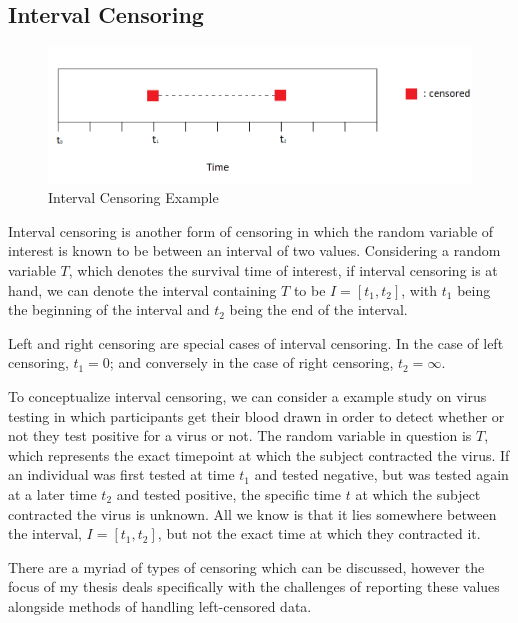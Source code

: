 \documentclass[12pt, twoside]{amherstthesis}
\begin{document}
\hypertarget{interval}{%
\subsection{Interval Censoring}\label{interval}}
\begin{figure}

{\centering \includegraphics[width=1\linewidth]{figures/interval_censoring_example_fix} 

}

\caption{Interval Censoring Example}\label{fig:intervalcensoringexample}
\end{figure}
Interval censoring is another form of censoring in which the random variable of interest is known to be between an interval of two values. Considering a random variable \(T\), which denotes the survival time of interest, if interval censoring is at hand, we can denote the interval containing \(T\) to be \(I = [t_1, t_2]\), with \(t_1\) being the beginning of the interval and \(t_2\) being the end of the interval.

Left and right censoring are special cases of interval censoring. In the case of left censoring, \(t_1 = 0\); and conversely in the case of right censoring, \(t_2 = \infty\).

To conceptualize interval censoring, we can consider a example study on virus testing in which participants get their blood drawn in order to detect whether or not they test positive for a virus or not. The random variable in question is \(T\), which represents the exact timepoint at which the subject contracted the virus. If an individual was first tested at time \(t_1\) and tested negative, but was tested again at a later time \(t_2\) and tested positive, the specific time \(t\) at which the subject contracted the virus is unknown. All we know is that it lies somewhere between the interval, \(I = [t_1, t_2]\), but not the exact time at which they contracted it.

There are a myriad of types of censoring which can be discussed, however the focus of my thesis deals specifically with the challenges of reporting these values alongside methods of handling left-censored data.
\end{document}
